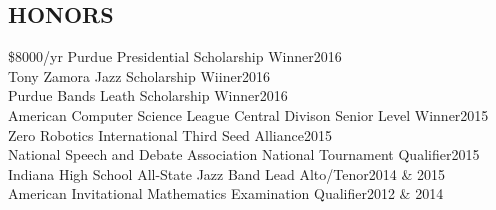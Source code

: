 \documentclass[line,margin]{res}
\begin{document}
\begin{resume}
  \section{HONORS}
  \$8000/yr Purdue Presidential Scholarship Winner\hfill 2016\\
  Tony Zamora Jazz Scholarship Wiiner\hfill 2016\\
  Purdue Bands Leath Scholarship Winner\hfill 2016\\
  American Computer Science League Central Divison Senior Level Winner\hfill 2015\\
  Zero Robotics International Third Seed Alliance\hfill 2015\\
  National Speech and Debate Association National Tournament Qualifier\hfill 2015\\
  Indiana High School All-State Jazz Band Lead Alto/Tenor\hfill 2014 \& 2015\\
  American Invitational Mathematics Examination Qualifier\hfill 2012 \& 2014

\end{resume}
\end{document}
